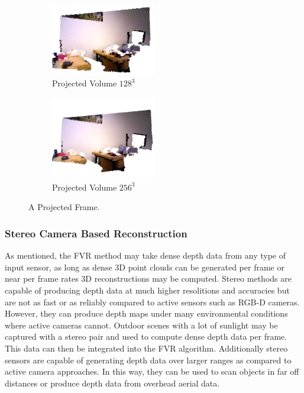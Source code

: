 \begin{figure}[!htb]
         \begin{subfigure}[b]{1.8in}
                \includegraphics[width=1.8in]{images/ch2/volumeF11128}
                \caption{Projected Volume $128^3$}
                \label{fig:VOLUMEEXAMPLE128}
        \end{subfigure}%
         \begin{subfigure}[b]{1.8in}
                \includegraphics[width=1.8in]{images/ch2/volumeF11256}
                \caption{Projected Volume $256^3$}
                \label{fig:VOLUMEEXAMPLE384}
        \end{subfigure}%
       \caption{A Projected Frame.}
       \label{fig:PROJECTED_FRAME}
\end{figure}

\subsubsection{Stereo Camera Based Reconstruction}
\label{subsec:SCBR}
As mentioned, the FVR method may take dense depth data from any type of input sensor, as long as dense 3D point clouds can be generated per frame or near per frame rates 3D reconstructions may be computed. Stereo methods are capable of producing depth data at much higher resolitions and accuracies but are not as fast or as reliably compared to active sensors such as RGB-D cameras. However, they can produce depth maps under many environmental conditions where active cameras cannot. Outdoor scenes with a lot of sunlight may be captured with a stereo pair and used to compute dense depth data per frame. This data can then be integrated into the FVR algorithm. Additionally stereo sensors are capable of generating depth data over larger ranges as compared to active camera approaches. In this way, they can be used to scan objects in far off distances or produce depth data from overhead aerial data. \\


